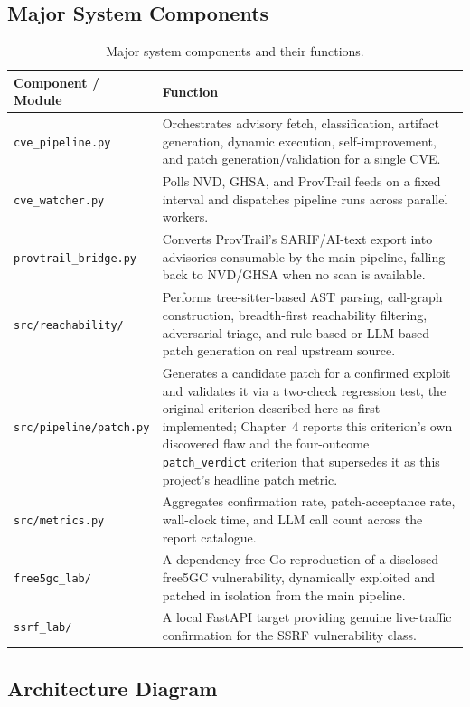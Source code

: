 \documentclass[12pt,a4paper]{report}
\begin{document}
\subsection{Major System Components}

\begin{table}[H]
\centering
\caption{Major system components and their functions.}
\label{tab:components}
\begin{tabular}{@{}p{4cm}p{9cm}@{}}
\toprule
\textbf{Component / Module} & \textbf{Function} \\
\midrule
\texttt{cve\_pipeline.py} & Orchestrates advisory fetch, classification, artifact generation, dynamic execution, self-improvement, and patch generation/validation for a single CVE. \\
\texttt{cve\_watcher.py} & Polls NVD, GHSA, and ProvTrail feeds on a fixed interval and dispatches pipeline runs across parallel workers. \\
\texttt{provtrail\_bridge.py} & Converts ProvTrail's SARIF/AI-text export into advisories consumable by the main pipeline, falling back to NVD/GHSA when no scan is available. \\
\texttt{src/reachability/} & Performs tree-sitter-based AST parsing, call-graph construction, breadth-first reachability filtering, adversarial triage, and rule-based or LLM-based patch generation on real upstream source. \\
\texttt{src/pipeline/patch.py} & Generates a candidate patch for a confirmed exploit and validates it via a two-check regression test, the original criterion described here as first implemented; Chapter~4 reports this criterion's own discovered flaw and the four-outcome \texttt{patch\_verdict} criterion that supersedes it as this project's headline patch metric. \\
\texttt{src/metrics.py} & Aggregates confirmation rate, patch-acceptance rate, wall-clock time, and LLM call count across the report catalogue. \\
\texttt{free5gc\_lab/} & A dependency-free Go reproduction of a disclosed free5GC vulnerability, dynamically exploited and patched in isolation from the main pipeline. \\
\texttt{ssrf\_lab/} & A local FastAPI target providing genuine live-traffic confirmation for the SSRF vulnerability class. \\
\bottomrule
\end{tabular}
\end{table}

\subsection{Architecture Diagram}
\end{document}
